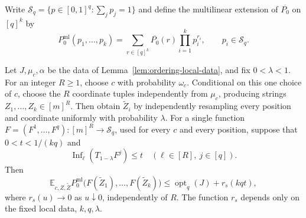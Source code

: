 Write
\(\mathcal S_q=\{p\in[0,1]^q:\sum_jp_j=1\}\) and define the
multilinear extension of \(\overline{P_0}\) on \([q]^k\) by
\begin{equation}
 P_0^{\mathrm{ml}}(p_1,\ldots,p_k)
 =\sum_{r\in[q]^k}\overline{P_0}(r)
       \prod_{i=1}^k p_i^{r_i},
 \qquad p_i\in\mathcal S_q.
\label{eq:ordering-multilinear}
\end{equation}

\begin{lemma}\label{lem:ordering-rounding}
Let \(J,\mu_c,\alpha\) be the data of
Lemma~\ref{lem:ordering-local-data}, and fix \(0<\lambda<1\).
For an integer \(R\ge1\), choose \(c\) with probability \(\omega_c\).
Conditional on this one choice of \(c\), choose the \(R\) coordinate
tuples independently from \(\mu_c\), producing strings
\(Z_1,\ldots,Z_k\in[m]^R\).
Then obtain \(\widetilde Z_i\) by independently resampling every
position and coordinate uniformly with probability \(\lambda\).
For a single function \(F=(F^1,\ldots,F^q):[m]^R\to\mathcal S_q\),
used for every \(c\) and every position, suppose that
\(0<t<1/(kq)\) and
\[
 \operatorname{Inf}_\ell(T_{1-\lambda}F^j)\le t
 \quad(\ell\in[R],\ j\in[q]).
\]
Then
\begin{equation}
 \mathbb E_{c,Z,\widetilde Z}
 P_0^{\mathrm{ml}}\bigl(F(\widetilde Z_1),\ldots,
                         F(\widetilde Z_k)\bigr)
 \le \operatorname{opt}_q(J)+r_s(kqt),
\label{eq:ordering-rounding}
\end{equation}
where \(r_s(u)\to0\) as \(u\downarrow0\), independently of \(R\).
The function \(r_s\) depends only on the fixed local data,
\(k,q,\lambda\).
\end{lemma}

